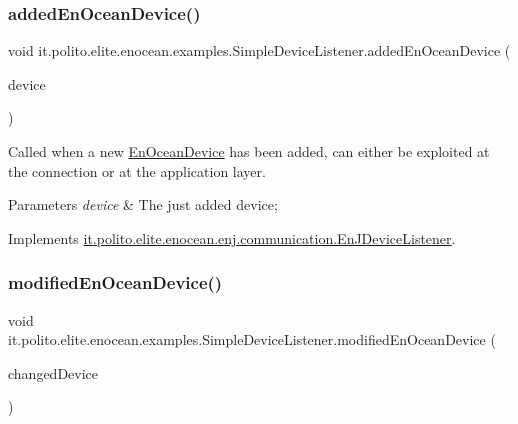 \subsubsection{\texorpdfstring{added\+En\+Ocean\+Device()}{addedEnOceanDevice()}}
{\footnotesize\ttfamily void it.\+polito.\+elite.\+enocean.\+examples.\+Simple\+Device\+Listener.\+added\+En\+Ocean\+Device (\begin{DoxyParamCaption}\item[{\hyperlink{classit_1_1polito_1_1elite_1_1enocean_1_1enj_1_1model_1_1_en_ocean_device}{En\+Ocean\+Device}}]{device }\end{DoxyParamCaption})}

Called when a new \hyperlink{}{En\+Ocean\+Device} has been added, can either be exploited at the connection or at the application layer.


\begin{DoxyParams}{Parameters}
{\em device} & The just added device; \\
\hline
\end{DoxyParams}


Implements \hyperlink{interfaceit_1_1polito_1_1elite_1_1enocean_1_1enj_1_1communication_1_1_en_j_device_listener_a4d573c1f79d5f174ad22f8ce999c972d}{it.\+polito.\+elite.\+enocean.\+enj.\+communication.\+En\+J\+Device\+Listener}.

\hypertarget{classit_1_1polito_1_1elite_1_1enocean_1_1examples_1_1_simple_device_listener_af8ecaa5dd2d0fcb5907d939d7428eb5d}{}\label{classit_1_1polito_1_1elite_1_1enocean_1_1examples_1_1_simple_device_listener_af8ecaa5dd2d0fcb5907d939d7428eb5d} 
\subsubsection{\texorpdfstring{modified\+En\+Ocean\+Device()}{modifiedEnOceanDevice()}}
{\footnotesize\ttfamily void it.\+polito.\+elite.\+enocean.\+examples.\+Simple\+Device\+Listener.\+modified\+En\+Ocean\+Device (\begin{DoxyParamCaption}\item[{\hyperlink{classit_1_1polito_1_1elite_1_1enocean_1_1enj_1_1model_1_1_en_ocean_device}{En\+Ocean\+Device}}]{changed\+Device }\end{DoxyParamCaption})}

